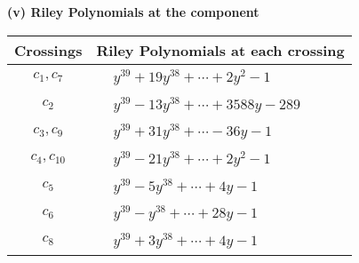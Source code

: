 \documentclass[1p]{elsarticle_modified}
\theoremstyle{definition}
\begin{document}
\newpage\renewcommand{\arraystretch}{1}
\flushleft \textbf{(v) Riley Polynomials at the component}\newline \\
\begin{tabular}{m{50pt}|m{274pt}}
Crossings & \hspace{64pt}Riley Polynomials at each crossing \\
\hline $$\begin{aligned}c_{1},c_{7}\end{aligned}$$&$\begin{aligned}
&y^{39}+19 y^{38}+\cdots+2 y^2-1
\end{aligned}$\\
\hline $$\begin{aligned}c_{2}\end{aligned}$$&$\begin{aligned}
&y^{39}-13 y^{38}+\cdots+3588 y-289
\end{aligned}$\\
\hline $$\begin{aligned}c_{3},c_{9}\end{aligned}$$&$\begin{aligned}
&y^{39}+31 y^{38}+\cdots-36 y-1
\end{aligned}$\\
\hline $$\begin{aligned}c_{4},c_{10}\end{aligned}$$&$\begin{aligned}
&y^{39}-21 y^{38}+\cdots+2 y^2-1
\end{aligned}$\\
\hline $$\begin{aligned}c_{5}\end{aligned}$$&$\begin{aligned}
&y^{39}-5 y^{38}+\cdots+4 y-1
\end{aligned}$\\
\hline $$\begin{aligned}c_{6}\end{aligned}$$&$\begin{aligned}
&y^{39}- y^{38}+\cdots+28 y-1
\end{aligned}$\\
\hline $$\begin{aligned}c_{8}\end{aligned}$$&$\begin{aligned}
&y^{39}+3 y^{38}+\cdots+4 y-1
\end{aligned}$\\
\hline
\end{tabular}\\~\\
\end{document}
